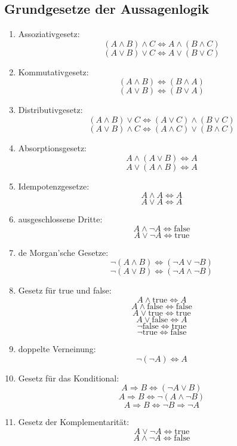 \documentclass[12pt,a4paper,titlepage]{article} %
\theoremstyle{definition}
\theoremstyle{remark}
\begin{document}
	\subsection{Grundgesetze der Aussagenlogik}
	\begin{enumerate}
		\item Assoziativgesetz:
		\[(A \wedge B) \wedge C \Leftrightarrow A \wedge (B \wedge C)\]
		\[(A \vee B) \vee C \Leftrightarrow A \vee (B \vee C)\]
		\item Kommutativgesetz:
		\[(A \wedge B) \Leftrightarrow (B \wedge A)\]
		\[(A \vee B) \Leftrightarrow (B \vee A)\]
		\item Distributivgesetz:
		\[(A \wedge B) \vee C \Leftrightarrow (A \vee C) \wedge (B \vee C)\]
		\[(A \vee B) \wedge C \Leftrightarrow (A \wedge C) \vee (B \wedge C)\]
		\item Absorptionsgesetz:
		\[A \wedge (A \vee B) \Leftrightarrow A\]
		\[A \vee (A \wedge B) \Leftrightarrow A\]
		\item Idempotenzgesetze:
		\[A \wedge A \Leftrightarrow A\]
		\[A \vee A \Leftrightarrow A\]
		\item ausgeschlossene Dritte:
		\[A \wedge \neg A \Leftrightarrow \text{false}\]
		\[A \vee \neg A \Leftrightarrow \text{true}\]
		\item de Morgan'sche Gesetze:
		\[\neg (A \wedge B) \Leftrightarrow (\neg A \vee \neg B)\]
		\[\neg (A \vee B) \Leftrightarrow (\neg A \wedge \neg B)\]
		\item Gesetz für true und false:
		\[A \wedge \text{true} \Leftrightarrow A\]
		\[A \wedge \text{false} \Leftrightarrow \text{false}\]
		\[A \vee \text{true} \Leftrightarrow \text{true}\]
		\[A \vee \text{false} \Leftrightarrow A\]
		\[\neg \text{false} \Leftrightarrow \text{true}\]
		\[\neg \text{true} \Leftrightarrow \text{false}\]
		\item doppelte Verneinung:
		\[\neg (\neg A) \Leftrightarrow A\]
		\item Gesetz für das Konditional:
		\[A \Rightarrow B \Leftrightarrow (\neg A \vee B)\]
		\[A \Rightarrow B \Leftrightarrow \neg (A \wedge \neg B)\]
		\[A \Rightarrow B \Leftrightarrow \neg B \Rightarrow \neg A\]
		\item Gesetz der Komplementarität:
		\[A \vee \neg A \Leftrightarrow \text{true}\]
		\[A \wedge \neg A \Leftrightarrow \text{false}\]
	\end{enumerate}	
\end{document}
